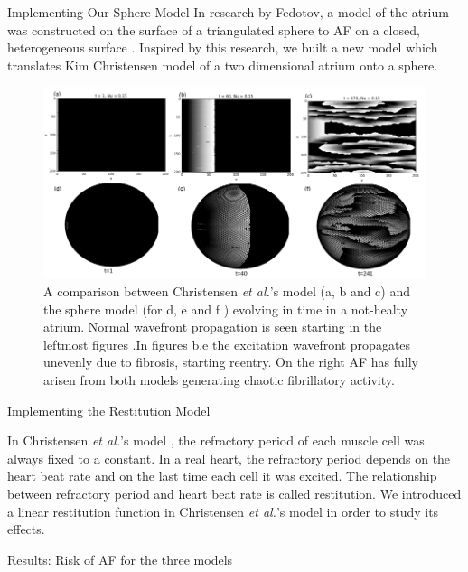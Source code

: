 \documentclass[final,hyperref={pdfpagelabels=false}]{beamer}
\begin{document}
\begin{frame}[t]
\begin{columns}[t]
\begin{column}{.465\textwidth}
\begin{block}{Implementing Our Sphere Model}
In research by Fedotov, a model of the atrium was constructed on the surface of a triangulated sphere to AF on a closed, heterogeneous surface \cite{Fedotov}. Inspired by this research, we built a new model which translates Kim Christensen model of a two dimensional atrium onto a sphere.



\begin{figure}
\includegraphics[width=0.8\linewidth]{combchristensenspherefib}
\caption{A comparison between Christensen \emph{et al.}'s model  (a, b and c)  and the sphere model (for d, e and f ) evolving in time in a not-healty atrium. Normal wavefront propagation is seen starting in the leftmost figures .In figures b,e the excitation wavefront propagates unevenly due to fibrosis, starting reentry. On the right AF has fully arisen from both models generating chaotic fibrillatory activity.}
\end{figure}

\end{block}

\begin{block}{Implementing the Restitution Model}

In Christensen \emph{et al.}'s model \cite{Christensen}, the refractory period of each muscle cell was always fixed to a constant.
In a real heart, the refractory period depends on the heart beat rate and on the last time each cell it was excited. The relationship between refractory period and heart beat rate is called restitution. We introduced a linear restitution function in  Christensen \emph{et al.}'s model in order to study its effects.
\end{block}


\begin{block}{Results: Risk of AF for the three models}


\end{block}
\end{column}
\end{columns}
\end{frame}
\end{document}
